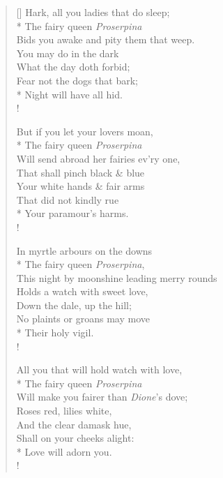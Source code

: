 \documentclass[MAIN]{subfiles}
\begin{document}
\settowidth{\versewidth}{Bids you awake and pity them that weep.}
\begin{verse}[\versewidth]
Hark, all you ladies that do sleep;\\*
The fairy queen \emph{Proserpina}\\
Bids you awake and pity them that weep.\\
\vin You may do in the dark\\
\vin \vin What the day doth forbid;\\
\vin Fear not the dogs that bark;\\*
\vin \vin Night will have all hid.\\!

But if you let your lovers moan,\\*
The fairy queen \emph{Proserpina}\\
Will send abroad her fairies ev'ry one,\\
\vin That shall pinch black \& blue\\
\vin \vin Your white hands \& fair arms\\
\vin That did not kindly rue\\*
\vin \vin Your paramour's harms.\\!

In myrtle arbours on the downs\\*
The fairy queen \emph{Proserpina},\\
This night by moonshine leading merry rounds\\
\vin Holds a watch with sweet love,\\
\vin \vin Down the dale, up the hill;\\
\vin No plaints or groans may move\\*
\vin \vin Their holy vigil.\\!

All you that will hold watch with love,\\*
The fairy queen \emph{Proserpina}\\
Will make you fairer than \emph{Dione}'s dove;\\
\vin Roses red, lilies white,\\
\vin \vin And the clear damask hue,\\
\vin Shall on your cheeks alight:\\*
\vin \vin Love will adorn you.\\!


\end{verse}
\end{document}
